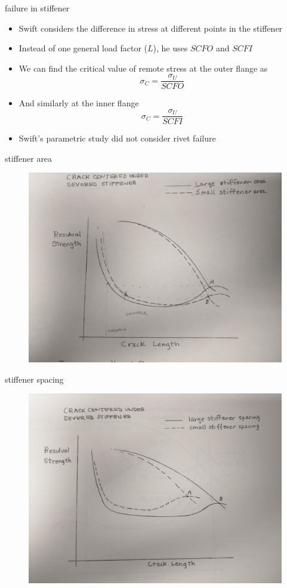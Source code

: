 \documentclass[10pt]{beamer}
\begin{document}
\begin{frame}{failure in stiffener}
	\begin{itemize}[<+->]
		\item Swift considers the difference in stress at different points in the stiffener
		\item Instead of one general load factor ($L$), he uses $SCFO$ and $SCFI$
		\item We can find the critical value of remote stress at the outer flange as
		\begin{equation}
		\sigma_C = \frac{\sigma_U}{SCFO}
		\end{equation}
		\item And similarly at the inner flange
		\begin{equation}
		\sigma_C = \frac{\sigma_U}{SCFI}
		\end{equation}
		\item Swift's parametric study did not consider rivet failure
	\end{itemize}
\end{frame}

\begin{frame}{stiffener area}
\begin{figure}
\centering
\includegraphics[width=0.7\linewidth]{stiffener_area}
\label{fig:stiffener_area}
\end{figure}
\end{frame}

\begin{frame}{stiffener spacing}
\begin{figure}
\centering
\includegraphics[width=0.7\linewidth]{stiffener_spacing}
\label{fig:stiffener_spacing}
\end{figure}
\end{frame}
\end{document}
